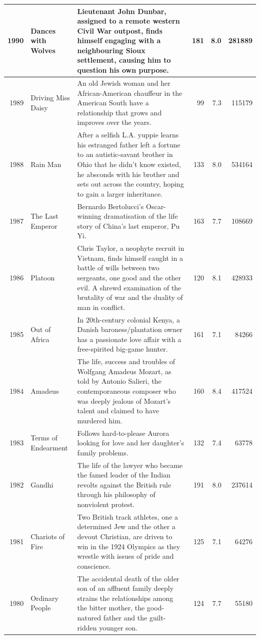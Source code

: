 \documentclass[
]{book}
\begin{document}
\begin{tabular}{r|l|l|r|r|r}
\hline
1990 & Dances with Wolves & Lieutenant John Dunbar, assigned to a remote western Civil War outpost, finds himself engaging with a neighbouring Sioux settlement, causing him to question his own purpose. & 181 & 8.0 & 281889\\
\hline
1989 & Driving Miss Daisy & An old Jewish woman and her African-American chauffeur in the American South have a relationship that grows and improves over the years. & 99 & 7.3 & 115179\\
\hline
1988 & Rain Man & After a selfish L.A. yuppie learns his estranged father left a fortune to an autistic-savant brother in Ohio that he didn't know existed, he absconds with his brother and sets out across the country, hoping to gain a larger inheritance. & 133 & 8.0 & 534164\\
\hline
1987 & The Last Emperor & Bernardo Bertolucci's Oscar-winning dramatisation of the life story of China's last emperor, Pu Yi. & 163 & 7.7 & 108669\\
\hline
1986 & Platoon & Chris Taylor, a neophyte recruit in Vietnam, finds himself caught in a battle of wills between two sergeants, one good and the other evil. A shrewd examination of the brutality of war and the duality of man in conflict. & 120 & 8.1 & 428933\\
\hline
1985 & Out of Africa & In 20th-century colonial Kenya, a Danish baroness/plantation owner has a passionate love affair with a free-spirited big-game hunter. & 161 & 7.1 & 84266\\
\hline
1984 & Amadeus & The life, success and troubles of Wolfgang Amadeus Mozart, as told by Antonio Salieri, the contemporaneous composer who was deeply jealous of Mozart's talent and claimed to have murdered him. & 160 & 8.4 & 417524\\
\hline
1983 & Terms of Endearment & Follows hard-to-please Aurora looking for love and her daughter's family problems. & 132 & 7.4 & 63778\\
\hline
1982 & Gandhi & The life of the lawyer who became the famed leader of the Indian revolts against the British rule through his philosophy of nonviolent protest. & 191 & 8.0 & 237614\\
\hline
1981 & Chariots of Fire & Two British track athletes, one a determined Jew and the other a devout Christian, are driven to win in the 1924 Olympics as they wrestle with issues of pride and conscience. & 125 & 7.1 & 64276\\
\hline
1980 & Ordinary People & The accidental death of the older son of an affluent family deeply strains the relationships among the bitter mother, the good-natured father and the guilt-ridden younger son. & 124 & 7.7 & 55180\\

\end{tabular}
\end{document}

